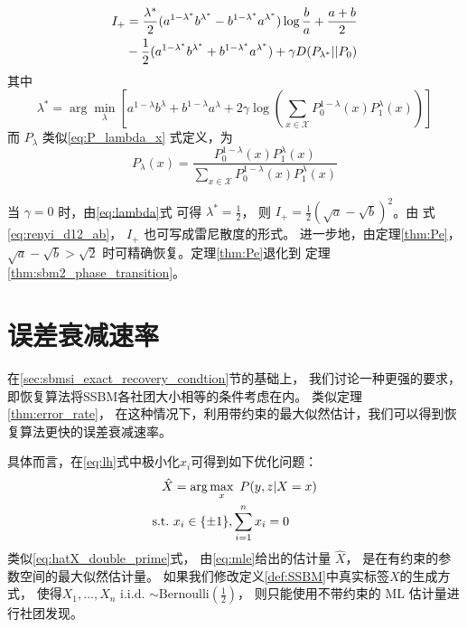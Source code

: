 \begin{lemma}\label{lem:I_plus_expression}
\begin{align}\label{equation:I+}
    I_+ &=\frac{\lambda^* }{2} (a^{1-\lambda^* }b^{\lambda^* } -
    b^{1-\lambda^* }a^{\lambda^* })\log\frac{b}{a}+\frac{a+b}{2}\notag \\
    &-\frac{1}{2}(a^{1-\lambda^*}b^{\lambda^*} +
    b^{1-\lambda^* }a^{\lambda^* })+\gamma D(P_{\lambda^* }||P_0) 
	\end{align}
	其中
	\begin{equation}\label{eq:lambda}
    \lambda^* = \arg\min_{\lambda} \left[a^{1-\lambda}b^{\lambda} +
    b^{1-\lambda}a^{\lambda} + 2\gamma \log
    \left(\sum_{x\in \mathcal{X}}P^{1-\lambda}_0(x) P^{\lambda}_1(x)
    \right)
    \right]
\end{equation}
而 $P_{\lambda}$ 类似\eqref{eq:P_lambda_x} 式定义，为
\begin{equation}\label{eq:P_lambda_0_1}
    P_{\lambda}(x) = \frac{P_0^{1-\lambda}(x) P_1^{\lambda} (x)}
    {\sum_{x \in \mathcal{X}}P_0^{1-\lambda}(x) P_1^{\lambda} (x)}        
\end{equation}

\end{lemma}



\begin{remark}
当 $\gamma=0$ 时，由\eqref{eq:lambda}式 可得 $\lambda^*=\frac{1}{2}$，
则 $I_+=\frac{1}{2}(\sqrt{a}-\sqrt{b})^2$。由 式 \eqref{eq:renyi_d12_ab}，
$I_+$ 也可写成雷尼散度的形式。
进一步地，由定理\ref{thm:Pe}，$\sqrt{a}-\sqrt{b} > \sqrt{2}$
时可精确恢复。定理\ref{thm:Pe}退化到
定理\ref{thm:sbm2_phase_transition}。
\end{remark}

\section{误差衰减速率}\label{sec:sbmsi_error_decay_rate}
在\ref{sec:sbmsi_exact_recovery_condtion}节的基础上，
我们讨论一种更强的要求，即恢复算法将SSBM各社团大小相等的条件考虑在内。
类似定理\ref{thm:error_rate}，
在这种情况下，利用带约束的最大似然估计，我们可以得到恢复算法更快的误差衰减速率。

具体而言，在\eqref{eq:lh}式中极小化$x_i$可得到如下优化问题：
\begin{align}
    \hat{X} &= \arg\max_x\ P(y,z|X=x) \notag \\
    \textrm{s.t.} \ & x_i \in \{\pm 1\}, \sum_{i=1}^n x_i=0 \label{eq:mle}
\end{align}
类似\eqref{eq:hatX_double_prime}式，
由\eqref{eq:mle}给出的估计量 $\hat{X}$，
是在有约束的参数空间的最大似然估计量。
如果我们修改定义\ref{def:SSBM}中真实标签$X$的生成方式，
使得$X_1, \dots, X_n$ i.i.d. $\sim \textrm{Bernoulli}(\frac{1}{2})$，
则只能使用不带约束的 ML 估计量进行社团发现。

